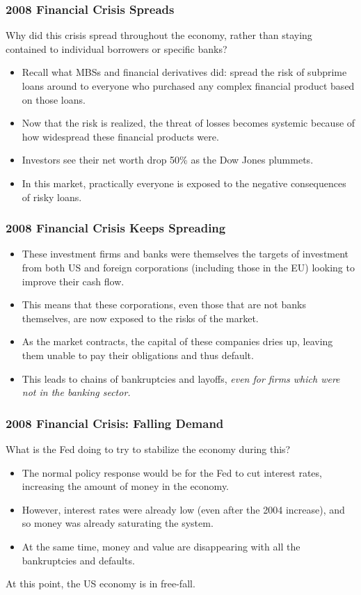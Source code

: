 \documentclass[handout]{beamer}
\begin{document}
\begin{frame} 
	\frametitle{\LARGE{2008 Financial Crisis Spreads}}
	Why did this crisis spread throughout the economy, rather than staying contained to individual borrowers or specific banks?
	\begin{itemize}
		\item Recall what MBSs and financial derivatives did: spread the risk of subprime loans around to everyone who purchased any complex financial product based on those loans. \pause
		\item Now that the risk is realized, the threat of losses becomes systemic because of how widespread these financial products were.
		\item Investors see their net worth drop 50\% as the Dow Jones plummets. \pause
		\item In this market, practically everyone is exposed to the negative consequences of risky loans.
	\end{itemize}
\end{frame}

\begin{frame} 
	\frametitle{\LARGE{2008 Financial Crisis Keeps Spreading}}
	\begin{itemize}
		\item These investment firms and banks were themselves the targets of investment from both US and foreign corporations (including those in the EU) looking to improve their cash flow. \pause
		\item This means that these corporations, even those that are not banks themselves, are now exposed to the risks of the market.
		\item As the market contracts, the capital of these companies dries up, leaving them unable to pay their obligations and thus default.
		\item This leads to chains of bankruptcies and layoffs, \textit{even for firms which were not in the banking sector.}
	\end{itemize}
\end{frame}

\begin{frame} 
	\frametitle{\LARGE{2008 Financial Crisis: Falling Demand}}
	What is the Fed doing to try to stabilize the economy during this?
	\begin{itemize}
		\item The normal policy response would be for the Fed to cut interest rates, increasing the amount of money in the economy. \pause
		\item However, interest rates were already low (even after the 2004 increase), and so money was already saturating the system. \pause
		\item At the same time, money and value are disappearing with all the bankruptcies and defaults. 
	\end{itemize}
	At this point, the US economy is in free-fall.
\end{frame}
\end{document}
